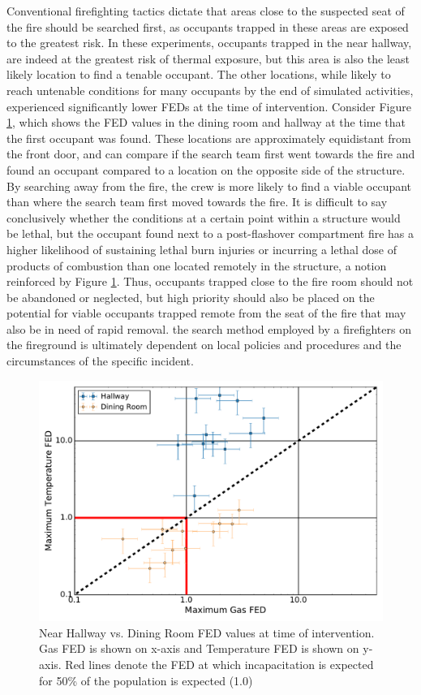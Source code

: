 \documentclass[12pt,oneside]{article}
\begin{document}
Conventional firefighting tactics \cite{Mittendorf,Norman} dictate that areas close to the suspected seat of the fire should be searched first, as occupants trapped in these areas are exposed to the greatest risk. In these experiments, occupants trapped in the near hallway, are indeed at the greatest risk of thermal exposure, but this area is also the least likely location to find a tenable occupant.  The other locations, while likely to reach untenable conditions for many occupants by the end of simulated activities, experienced significantly lower FEDs at the time of intervention. Consider Figure \ref{fig:open_FED_compare}, which shows the FED values in the dining room and hallway at the time that the first occupant was found. These locations are approximately equidistant from the front door, and can compare if the search team first went towards the fire and found an occupant compared to a location on the opposite side of the structure. By searching away from the fire, the crew is more likely to find a viable occupant than where the search team first moved towards the fire. It is difficult to say conclusively whether the conditions at a certain point within a structure would be lethal, but the occupant found next to a post-flashover compartment fire has a higher likelihood of sustaining lethal burn injuries or incurring a lethal dose of products of combustion than one located remotely in the structure, a notion reinforced by Figure \ref{fig:open_FED_compare}. Thus, occupants trapped close to the fire room should not be abandoned or neglected, but high priority should also be placed on the potential for viable occupants trapped remote from the seat of the fire that may also be in need of rapid removal. the search method employed by a firefighters on the fireground is ultimately dependent on local policies and procedures and the circumstances of the specific incident. 

\begin{figure}[!ht]
	\centering
	\includegraphics[width=.75\textwidth]{../Figures/br_compare/Hall_vic1}
	\caption[Near Hallway vs. Dining Room FED values at time of intervention]{Near Hallway vs. Dining Room FED values at time of intervention. Gas FED is shown on x-axis and Temperature FED is shown on y-axis. Red lines denote the FED at which incapacitation is expected for 50\% of the population is expected (1.0)}
	\label{fig:open_FED_compare}
\end{figure}
\end{document}
